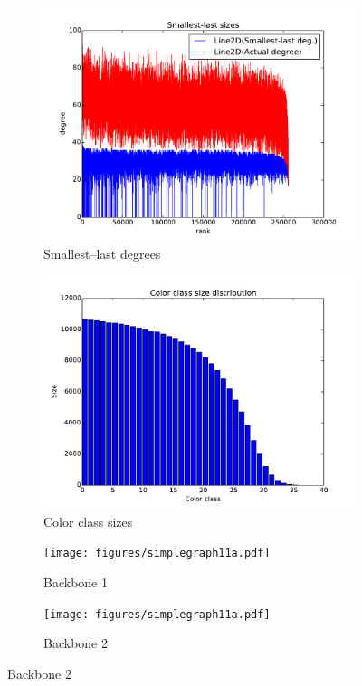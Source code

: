 \documentclass[oneside, titlepage]{scrartcl}
\begin{document}
\begin{figure}[!h]
\begin{subfigure}{0.5\textwidth}
	\centering
	\includegraphics[width=0.9\linewidth]{figures/ordering11.pdf}
	\caption{Smallest--last degrees}
\end{subfigure}%
\begin{subfigure}{0.5\textwidth}
	\centering
	\includegraphics[width=0.9\linewidth]{figures/colors11.pdf}
	\caption{Color class sizes}
\end{subfigure}

\begin{subfigure}{0.5\textwidth}
	\centering
	\texttt{[image: figures/simplegraph11a.pdf]}
	\caption{Backbone 1}
\end{subfigure}%
\begin{subfigure}{0.5\textwidth}
	\centering
	\texttt{[image: figures/simplegraph11a.pdf]}
	\caption{Backbone 2}
\end{subfigure}
\end{figure}
\end{document}
